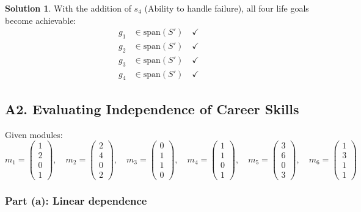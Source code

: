 \documentclass[12pt]{article}
\theoremstyle{definition}
\newtheorem{solution}{Solution}
\begin{document}
\begin{solution}
With the addition of $s_4$ (Ability to handle failure), all four life goals become achievable:
\begin{align*}
g_1 &\in \text{span}(S') \quad \checkmark \\
g_2 &\in \text{span}(S') \quad \checkmark \\
g_3 &\in \text{span}(S') \quad \checkmark \\
g_4 &\in \text{span}(S') \quad \checkmark
\end{align*}
\end{solution}

\newpage
\subsection*{A2. Evaluating Independence of Career Skills}

Given modules:
\[
m_1 = \begin{pmatrix} 1 \\ 2 \\ 0 \\ 1 \end{pmatrix}, \quad
m_2 = \begin{pmatrix} 2 \\ 4 \\ 0 \\ 2 \end{pmatrix}, \quad
m_3 = \begin{pmatrix} 0 \\ 1 \\ 1 \\ 0 \end{pmatrix}, \quad
m_4 = \begin{pmatrix} 1 \\ 1 \\ 0 \\ 1 \end{pmatrix}, \quad
m_5 = \begin{pmatrix} 3 \\ 6 \\ 0 \\ 3 \end{pmatrix}, \quad
m_6 = \begin{pmatrix} 1 \\ 3 \\ 1 \\ 1 \end{pmatrix}
\]

\subsubsection*{Part (a): Linear dependence}
\end{document}

